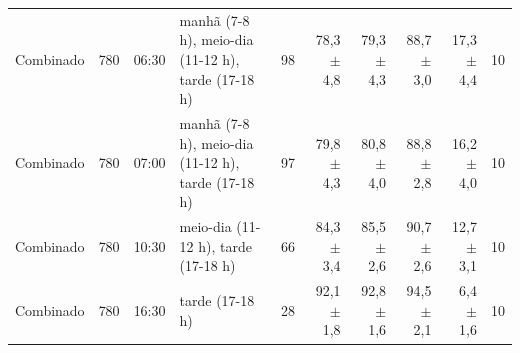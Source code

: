 \begin{table}[htbp]
\begin{tabular}{llllrrrrrr}
Combinado & 780 & 06:30 & manhã (7-8 h), meio-dia (11-12 h), tarde (17-18 h) & 98 & 78,3 $\pm$ 4,8 & 79,3 $\pm$ 4,3 & 88,7 $\pm$ 3,0 & 17,3 $\pm$ 4,4 & 10 \\
Combinado & 780 & 07:00 & manhã (7-8 h), meio-dia (11-12 h), tarde (17-18 h) & 97 & 79,8 $\pm$ 4,3 & 80,8 $\pm$ 4,0 & 88,8 $\pm$ 2,8 & 16,2 $\pm$ 4,0 & 10 \\
Combinado & 780 & 10:30 & meio-dia (11-12 h), tarde (17-18 h) & 66 & 84,3 $\pm$ 3,4 & 85,5 $\pm$ 2,6 & 90,7 $\pm$ 2,6 & 12,7 $\pm$ 3,1 & 10 \\
Combinado & 780 & 16:30 & tarde (17-18 h) & 28 & 92,1 $\pm$ 1,8 & 92,8 $\pm$ 1,6 & 94,5 $\pm$ 2,1 & 6,4 $\pm$ 1,6 & 10 \\
\bottomrule
\end{tabular}
\end{table}
